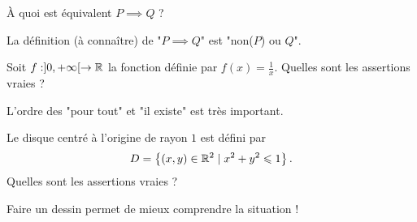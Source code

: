 \begin{question}
À quoi est équivalent $P \implies Q$ ?
\begin{answers}



\end{answers}
\begin{explanations}
La définition (à connaître) de "$P \implies Q$" est "non($P$) ou $Q$".
\end{explanations}
\end{question}


\begin{question}
Soit $f : ]0,+\infty[ \to \mathbb{R}$ la fonction définie par $f(x) = \frac{1}{x}$. Quelles sont les assertions vraies ?
\begin{answers}
    \good{$\forall x \in ]0,+\infty[ \quad \exists y \in \Rr \qquad y = f(x)$}

    \bad{$\exists x \in ]0,+\infty[ \quad \forall y \in \Rr \qquad y = f(x)$} 
    
    \good{$\exists x \in ]0,+\infty[ \quad \exists y \in \Rr \qquad y = f(x)$}

    \bad{$\forall x \in ]0,+\infty[ \quad \forall y \in \Rr \qquad y = f(x)$}
\end{answers}
\begin{explanations}
L'ordre des "pour tout" et "il existe" est très important.
\end{explanations}
\end{question}


\begin{question}
Le disque centré à l'origine de rayon $1$ est défini par 
$$D = \left\{ (x,y) \in \mathbb{R}^2 \mid x^2+y^2 \leqslant 1\right\}.$$
Quelles sont les assertions vraies ?
\begin{answers}
    


\end{answers}
\begin{explanations}
Faire un dessin permet de mieux comprendre la situation !
\end{explanations}
\end{question}




